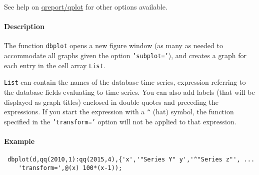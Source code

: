  See help on \url{qreport/qplot} for other options available.
 
 \paragraph{Description}
 
 The function \texttt{dbplot} opens a new figure window (as many as
 needed to accommodate all graphs given the option \texttt{'subplot='}),
 and creates a graph for each entry in the cell array \texttt{List}.
 
 \texttt{List} can contain the names of the database time series,
 expression referring to the database fields evaluating to time series.
 You can also add labels (that will be displayed as graph titles)
 enclosed in double quotes and preceding the expressions. If you start
 the expression with a \texttt{\^{}} (hat) symbol, the function specified
 in the \texttt{'transform='} option will not be applied to that
 expression.
 
 \paragraph{Example}
 
 \begin{verbatim}
 dbplot(d,qq(2010,1):qq(2015,4),{'x','"Series Y" y','^"Series z"', ...
    'transform=',@(x) 100*(x-1));
 \end{verbatim}



